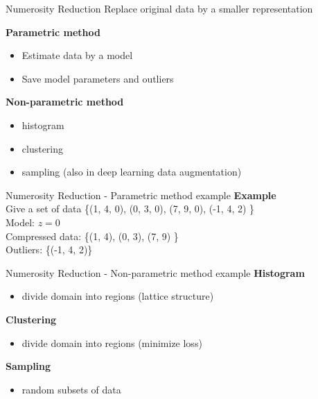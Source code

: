 \begin{frame}{Numerosity Reduction}
    Replace original data by a smaller representation

    \textbf{Parametric method} \\
    \begin{itemize}
        \item Estimate data by a model
        \item Save model parameters and outliers
    \end{itemize}
    \textbf{Non-parametric method}
    \begin{itemize}
        \item histogram
        \item clustering
        \item sampling (also in deep learning data augmentation)
    \end{itemize}
\end{frame}

\begin{frame}{Numerosity Reduction - Parametric method example}
    \textbf{Example} \\
    Give a set of data \{(1, 4, 0), (0, 3, 0), (7, 9, 0), (-1, 4, 2) \} \\
    Model: $z = 0$ \\
    Compressed data: \{(1, 4), (0, 3), (7, 9) \} \\
    Outliers: \{(-1, 4, 2)\} \\
\end{frame}

\begin{frame}{Numerosity Reduction - Non-parametric method example}
    \textbf{Histogram}
    \begin{itemize}
        \item divide domain into regions (lattice structure)
    \end{itemize}
    \textbf{Clustering}
    \begin{itemize}
        \item divide domain into regions (minimize loss)
    \end{itemize}
    \textbf{Sampling}
    \begin{itemize}
        \item random subsets of data
    \end{itemize}
\end{frame}

